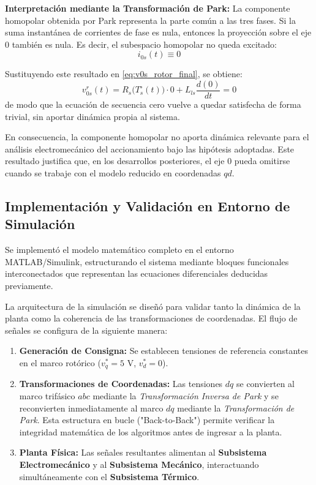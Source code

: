 \documentclass[12pt, a4paper,journal, onecolumn, compsoc]{IEEEtran}
\begin{document}
    \textbf{Interpretación mediante la Transformación de Park:}
    La componente homopolar obtenida por Park representa la parte común a las tres fases. Si la suma instantánea de corrientes de fase es nula, entonces la proyección sobre el eje \(0\) también es nula. Es decir, el subespacio homopolar no queda excitado:
    \begin{equation}
        i_{0s}(t)\equiv 0
    \end{equation}

    Sustituyendo este resultado en \eqref{eq:v0s_rotor_final}, se obtiene:
    \begin{equation}
        v_{0s}^r(t)=R_s\!\big(T_s^\circ(t)\big)\cdot 0 + L_{ls}\frac{d(0)}{dt}=0
    \end{equation}
    de modo que la ecuación de secuencia cero vuelve a quedar satisfecha de forma trivial, sin aportar dinámica propia al sistema.

    En consecuencia, la componente homopolar no aporta dinámica relevante para el análisis electromecánico del accionamiento bajo las hipótesis adoptadas. Este resultado justifica que, en los desarrollos posteriores, el eje \(0\) pueda omitirse cuando se trabaje con el modelo reducido en coordenadas \(qd\).


\subsection{Implementación y Validación en Entorno de Simulación}
Se implementó el modelo matemático completo en el entorno MATLAB/Simulink, estructurando el sistema mediante bloques funcionales interconectados que representan las ecuaciones diferenciales deducidas previamente.

La arquitectura de la simulación se diseñó para validar tanto la dinámica de la planta como la coherencia de las transformaciones de coordenadas. El flujo de señales se configura de la siguiente manera:
\begin{enumerate}
    \item \textbf{Generación de Consigna:} Se establecen tensiones de referencia constantes en el marco rotórico ($v_q^*=5$ V, $v_d^*=0$).
    \item \textbf{Transformaciones de Coordenadas:} Las tensiones $dq$ se convierten al marco trifásico $abc$ mediante la \textit{Transformación Inversa de Park} y se reconvierten inmediatamente al marco $dq$ mediante la \textit{Transformación de Park}. Esta estructura en bucle ("Back-to-Back") permite verificar la integridad matemática de los algoritmos antes de ingresar a la planta.
    \item \textbf{Planta Física:} Las señales resultantes alimentan al \textbf{Subsistema Electromecánico} y al \textbf{Subsistema Mecánico}, interactuando simultáneamente con el \textbf{Subsistema Térmico}.
\end{enumerate}
\end{document}
